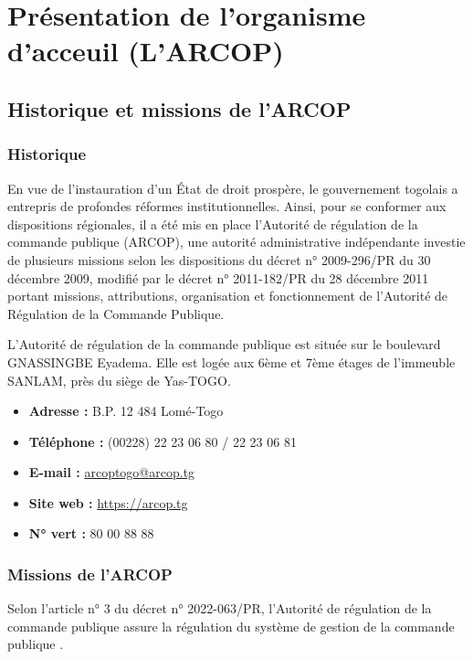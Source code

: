 \chapter{Présentation de l'organisme d'acceuil (L'ARCOP)}
\clearpage
\section{Historique et missions de l’ARCOP}

\subsection{Historique}
En vue de l’instauration d’un État de droit prospère, le gouvernement togolais a entrepris de profondes réformes institutionnelles. Ainsi, pour se conformer aux dispositions régionales, il a été mis en place l’Autorité de régulation de la commande publique (ARCOP), une autorité administrative indépendante investie de plusieurs missions selon les dispositions du décret n° 2009-296/PR du 30 décembre 2009, modifié par le décret n° 2011-182/PR du 28 décembre 2011 portant missions, attributions, organisation et fonctionnement de l’Autorité de Régulation de la Commande Publique.

L’Autorité de régulation de la commande publique est située sur le boulevard GNASSINGBE Eyadema. Elle est logée aux 6ème et 7ème étages de l’immeuble SANLAM, près du siège de Yas-TOGO.

\begin{itemize}
    \item \textbf{Adresse :} B.P. 12 484 Lomé-Togo
    \item \textbf{Téléphone :} (00228) 22 23 06 80 / 22 23 06 81
    \item \textbf{E-mail :} \href{arcoptogo@arcop.tg}{arcoptogo@arcop.tg}
    \item \textbf{Site web :} \href{https://arcop.tg}{https://arcop.tg}
    \item \textbf{N° vert :} 80 00 88 88
\end{itemize}

\subsection{Missions de l’ARCOP}
Selon l’article n° 3 du décret n° 2022-063/PR, \og l’Autorité de régulation de la commande publique assure la régulation du système de gestion de la commande publique \fg.

